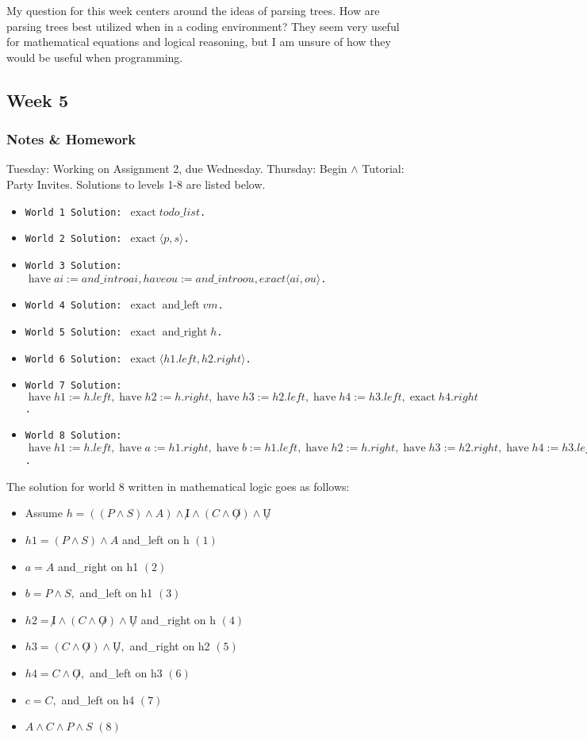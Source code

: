 \documentclass{article}
\DeclareMathOperator{\have}{have}
\DeclareMathOperator{\exact}{exact}
\DeclareMathOperator{\andLeft}{and\_left}
\DeclareMathOperator{\andRight}{and\_right}
\theoremstyle{theorem}
\theoremstyle{definition}
\theoremstyle{remark}
\begin{document}
My question for this week centers around the ideas of parsing trees. How are parsing trees best utilized when in a coding environment? They seem very useful for mathematical equations and logical reasoning, but I am unsure of how they would be useful when programming.


\subsection{Week 5}

\subsubsection{Notes \& Homework}
Tuesday: Working on Assignment 2, due Wednesday. 
\newline Thursday: Begin $\wedge$ Tutorial: Party Invites. Solutions to levels 1-8 are listed below.

\begin{itemize}
  \item \texttt{World 1 Solution: $\exact todo\_list$.}
  \item \texttt{World 2 Solution: $\exact \langle p, s \rangle$.}
  \item \texttt{World 3 Solution: $\have ai := and\_intro a i, have ou := and\_intro o u, exact \langle ai, ou \rangle$.}
  \item \texttt{World 4 Solution: $\exact \andLeft vm$.}
  \item \texttt{World 5 Solution: $\exact \andRight h$.}
  \item \texttt{World 6 Solution: $\exact \langle h1.left, h2.right \rangle$.}
  \item \texttt{World 7 Solution: $\have h1 := h.left, \have h2 := h.right, \have h3 := h2.left, \have h4 := h3.left, \exact h4.right$.}
  \item \texttt{World 8 Solution: $\have h1 := h.left, \have a := h1.right, \have b := h1.left, \have h2 := h.right, \have h3 := h2.right, \have h4 := h3.left, \have c := h4.left, \exact \langle a, b, c\rangle$.}
\end{itemize}

The solution for world 8 written in mathematical logic goes as follows: 

\begin{itemize}
  \item Assume $h=((P \wedge S) \wedge A) \wedge \not I \wedge (C \wedge \not O) \wedge \not U$
  \item $h1 = (P \wedge S) \wedge A$ and\_left on h $(1)$
  \item $a = A$ and\_right on h1 $(2)$
  \item $b = P \wedge S, $ and\_left on h1 $(3)$ 
  \item $h2 = \not I \wedge (C \wedge \not O) \wedge \not U$ and\_right on h $(4)$
  \item $h3 = (C \wedge \not O) \wedge \not U, $ and\_right on h2 $(5)$
  \item $h4 = C \wedge \not O, $ and\_left on h3 $(6)$
  \item $c = C, $ and\_left on h4 $(7)$
  \item $A \wedge C \wedge P \wedge S$ $(8)$
\end{itemize}
\end{document}
